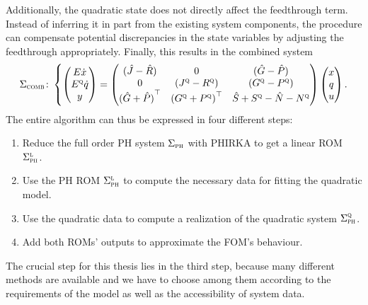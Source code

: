 Additionally, the quadratic state does not directly affect the feedthrough term.
Instead of inferring it in part from the existing system components, the procedure can compensate potential discrepancies in the state variables by adjusting the feedthrough appropriately.
Finally, this results in the combined system
\begin{equation}\label{eq:combined-quadratic-system}
    \Sigma_{\textnormal{\scshape comb}} \colon \left\lbrace
    \begin{pmatrix}
        E \dot{x} \\
        E^{\textnormal{\scshape q}} \dot{q} \\
        y
    \end{pmatrix} = \begin{pmatrix}
        (\hat{J} - \hat{R}) & 0 & (\hat{G} - \hat{P}) \\
        0 & (J^{\textnormal{\scshape q}} - R^{\textnormal{\scshape q}}) & (G^{\textnormal{\scshape q}} - P^{\textnormal{\scshape q}}) \\
        {(\hat{G} + \hat{P})}^{\top} & {(G^{\textnormal{\scshape q}} + P^{\textnormal{\scshape q}})}^{\top} & \hat{S} + S^{\textnormal{\scshape q}} - \hat{N} - N^{\textnormal{\scshape q}}
    \end{pmatrix} \begin{pmatrix}
        x \\
        q \\
        u
    \end{pmatrix}.
    \right.
\end{equation}
The entire algorithm can thus be expressed in four different steps:
\begin{enumerate}
    \item Reduce the full order \ac{PH} system $\Sigma_{\textnormal{\scshape ph}}$ with \ac{PHIRKA} to get a linear \ac{ROM} $\Sigma_{\textnormal{\scshape ph}}^{\textnormal{\scshape l}}$.
    \item Use the \ac{PH} \ac{ROM} $\Sigma_{\textnormal{\scshape ph}}^{\textnormal{\scshape l}}$ to compute the necessary data for fitting the quadratic model.
    \item Use the quadratic data to compute a realization of the quadratic system $\Sigma_{\textnormal{\scshape ph}}^{\textnormal{\scshape q}}$.
    \item Add both \acp{ROM}' outputs to approximate the \ac{FOM}'s behaviour.
\end{enumerate}
The crucial step for this thesis lies in the third step, because many different methods are available and we have to choose among them according to the requirements of the model as well as the accessibility of system data.


